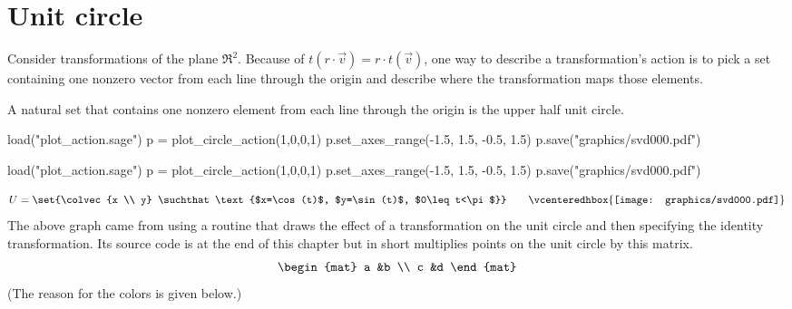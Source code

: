 \section{Unit circle}
Consider transformations of the plane $\Re^2$.
Because of $t(r\cdot\vec{v})=r\cdot t(\vec{v})$,
one way to describe a transformation's action is to pick 
a set containing one nonzero vector from each line through the origin
and describe where the transformation maps those elements.

A natural set that contains one nonzero element from each line through the
origin is the upper half unit circle.
\begin{sageoutput}
load("plot_action.sage")
p = plot_circle_action(1,0,0,1) 
p.set_axes_range(-1.5, 1.5, -0.5, 1.5) 
p.save("graphics/svd000.pdf")
\end{sageoutput}
\begin{sagesilent}
load("plot_action.sage")
p = plot_circle_action(1,0,0,1) 
p.set_axes_range(-1.5, 1.5, -0.5, 1.5) 
p.save("graphics/svd000.pdf")
\end{sagesilent}
\begin{equation*}
  U=\set{\colvec{x \\ y}
         \suchthat 
         \text{$x=\cos(t)$, $y=\sin(t)$, $0\leq t<\pi$}}
  \qquad
  \vcenteredhbox{\texttt{[image: graphics/svd000.pdf]}}  
\end{equation*}
The above 
graph came from  using a routine that draws the effect of a transformation 
on the unit circle
and then specifying the identity transformation.
Its source code is 
at the end of this chapter but in short 
multiplies points on 
the unit circle by this matrix.
\begin{equation*}
  \begin{mat}
    a &b \\
    c &d
  \end{mat}
\end{equation*}
(The reason for the colors is given below.)

